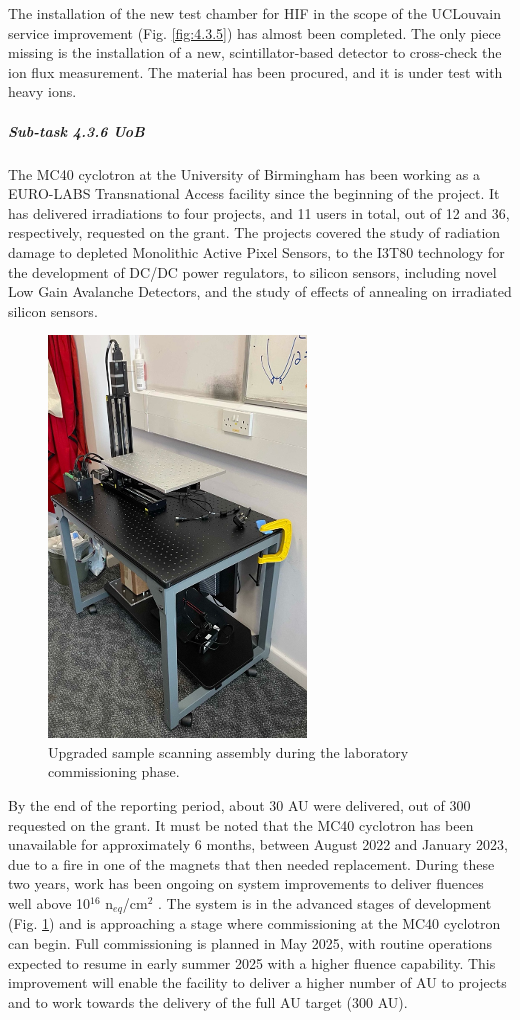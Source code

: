The installation of the new test chamber for HIF in the scope of the UCLouvain service improvement (Fig. \ref{fig:4.3.5}) has almost been completed. The only piece missing is the installation of a new, scintillator-based detector to cross-check the ion flux measurement. The material has been procured, and it is under test with heavy ions. 

\subparagraph{Sub-task 4.3.6 UoB} \mbox{}

The MC40 cyclotron at the University of Birmingham has been working as a EURO-LABS Transnational Access facility since the beginning of the project. It has delivered irradiations to four projects, and 11 users in total, out of 12 and 36, respectively, requested on the grant. The projects covered the study of radiation damage to depleted Monolithic Active Pixel Sensors, to the I3T80 technology for the development of DC/DC power regulators, to silicon sensors, including novel Low Gain Avalanche Detectors, and the study of effects of annealing on irradiated silicon sensors. 

\begin{figure}[!h]
    \centering
    \includegraphics[width=0.5\linewidth]{image12.png}
    \caption{Upgraded sample scanning assembly during the laboratory commissioning phase. }
    \label{fig:4.3.6}
\end{figure}

By the end of the reporting period, about 30 AU were delivered, out of 300 requested on the grant. It must be noted that the MC40 cyclotron has been unavailable for approximately 6 months, between August 2022 and January 2023, due to a fire in one of the magnets that then needed replacement. During these two years, work has been ongoing on system improvements to deliver fluences well above 10$^{16}$ n$_{eq}$/cm$^2$ . The system is in the advanced stages of development (Fig. \ref{fig:4.3.6}) and is approaching a stage where commissioning at the MC40 cyclotron can begin. Full commissioning is planned in May 2025, with routine operations expected to resume in early summer 2025 with a higher fluence capability. This improvement will enable the facility to deliver a higher number of AU to projects and to work towards the delivery of the full AU target (300 AU).

